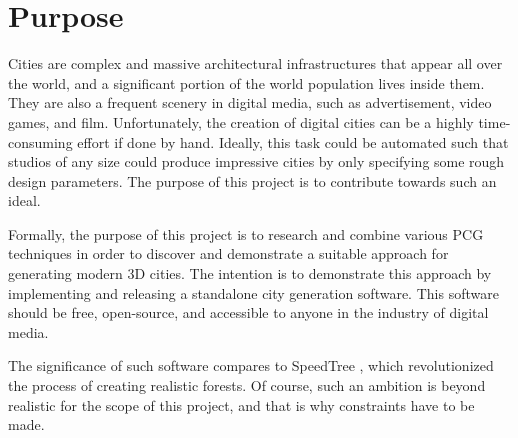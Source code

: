 \section{Purpose}


Cities are complex and massive architectural infrastructures that appear all over the world, and a significant portion of the world population lives inside them.
They are also a frequent scenery in digital media, such as advertisement, video games, and film.
Unfortunately, the creation of digital cities can be a highly time-consuming effort if done by hand.
Ideally, this task could be automated such that studios of any size could produce impressive cities by only specifying some rough design parameters.
The purpose of this project is to contribute towards such an ideal.

Formally, the purpose of this project is to research and combine various PCG techniques in order to discover and demonstrate a suitable approach for generating modern 3D cities. 
The intention is to demonstrate this approach by implementing and releasing a standalone city generation software.
This software should be free, open-source, and accessible to anyone in the industry of digital media.

The significance of such software compares to SpeedTree \cite{speedtree}, which revolutionized the process of creating realistic forests.
Of course, such an ambition is beyond realistic for the scope of this project, and that is why constraints have to be made.
